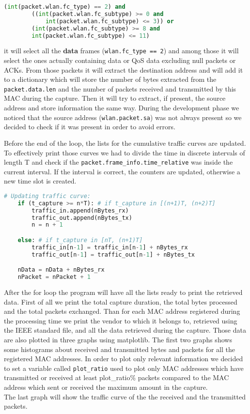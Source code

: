 \begin{lstlisting}[language=Python, caption=Packet filter]
    (int(packet.wlan.fc_type) == 2) and 
        ((int(packet.wlan.fc_subtype) >= 0 and 
            int(packet.wlan.fc_subtype) <= 3)) or
        (int(packet.wlan.fc_subtype) >= 8 and 
        int(packet.wlan.fc_subtype) <= 11)
\end{lstlisting}
it will select all the \textbf{data} frames (\texttt{wlan.fc\_type == 2}) and among those it will 
select the ones actually containing data or QoS data excluding null packets or ACKs. From 
those packets it will extract the destination address and will add it to a dictionary
which will store the number of bytes extracted from the \texttt{packet.data.len} and 
the number of packets received and transmitted by this MAC during the capture.
Then it will try to extract, if present, the source address and store information the same 
way. During the development phase we noticed that the source address (\texttt{wlan.packet.sa}) was 
not always present so we decided to check if it was present in order to avoid errors.

Before the end of the loop, the lists for the cumulative traffic curves are updated. To 
effectively print those curves we had to divide the time in discrete intervals of length T and 
check if the \texttt{packet.frame\_info.time\_relative} was inside the current interval. If the
interval is correct, the counters are updated, otherwise a new time slot is created.

\begin{lstlisting}[language=Python, caption=Packet filter]
    # Updating traffic curve:
    if (t_capture >= n*T): # if t_capture in [(n+1)T, (n+2)T]
        traffic_in.append(nBytes_rx)
        traffic_out.append(nBytes_tx)
        n = n + 1

    else: # if t_capture in [nT, (n+1)T]
        traffic_in[n-1] = traffic_in[n-1] + nBytes_rx
        traffic_out[n-1] = traffic_out[n-1] + nBytes_tx

    nData = nData + nBytes_rx
    nPacket = nPacket + 1
\end{lstlisting}

After the for loop the program will have all the lists ready to print the retrieved data.
First of all we print the total capture duration, the total bytes processed and the total 
packets exchanged. Than for each MAC address registered during the processing time we print
the vendor to which it belongs to, retrieved using the IEEE standard file, and all the 
data retrieved during the capture. Those data are also plotted in three graphs using matplotlib.
The first two graphs shows some histograms about received and transmitted bytes and packets for
all the registered MAC addresses. In order to plot only relevant information we decided to set
a variable called \texttt{plot\_ratio} used to plot only MAC addresses which have transmitted
or received at least plot\_ratio\% packets compared to the MAC address which sent or received 
the maximum amount in the capture.\\
The last graph will show the traffic curve of the the received and the transmitted packets.
